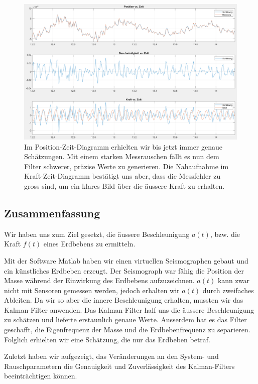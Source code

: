 \begin{figure}
	\begin{center}
		\includegraphics[width=\linewidth,keepaspectratio]{papers/erdbeben/Messrauschen_geaendert_zoom.PNG}
		\caption{Im Position-Zeit-Diagramm erhielten wir bis jetzt immer genaue Schätzungen. Mit einem starken Messrauschen fällt es nun dem Filter schwerer, präzise Werte zu generieren. Die Nahaufnahme im Kraft-Zeit-Diagramm bestätigt uns aber, dass die Messfehler zu gross sind, um ein klares Bild über die äussere Kraft zu erhalten.}
		\label{erdbeben:fig:messrauschen-geaendert_zoom}
	\end{center}
\end{figure}

\subsection{Zusammenfassung}
Wir haben uns zum Ziel gesetzt, die äussere Beschleunigung $a(t)$, bzw. die Kraft $f(t)$ eines Erdbebens zu ermitteln.

Mit der Software Matlab haben wir einen virtuellen Seismographen gebaut und ein künstliches Erdbeben erzeugt.
Der Seismograph war fähig die Position der Masse während der Einwirkung des Erdbebens aufzuzeichnen.
$a(t)$ kann zwar nicht mit Sensoren gemessen werden, jedoch erhalten wir $a(t)$ durch zweifaches Ableiten.
Da wir so aber die innere Beschleunigung erhalten, mussten wir das Kalman-Filter anwenden.
Das Kalman-Filter half uns die äussere Beschleunigung zu schätzen und lieferte erstaunlich genaue Werte.
Ausserdem hat es das Filter geschafft, die Eigenfrequenz der Masse und die Erdbebenfrequenz zu separieren.
Folglich erhielten wir eine Schätzung, die nur das Erdbeben betraf.

Zuletzt haben wir aufgezeigt, das Veränderungen an den System- und Rauschparametern die Genauigkeit und Zuverlässigkeit des Kalman-Filters beeinträchtigen können.

